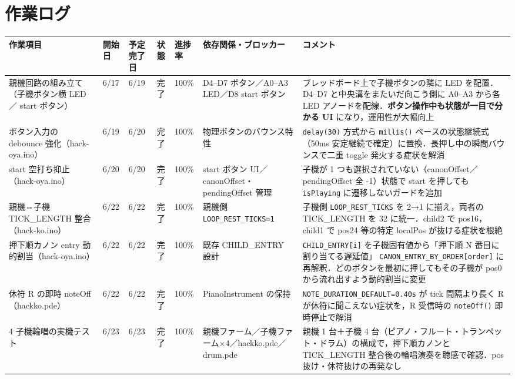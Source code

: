 \documentclass[a4paper,11pt]{ltjsarticle}
\providecommand{\％}{\%}
\begin{document}
\section{作業ログ}\label{sec:worklog}

\renewcommand{\arraystretch}{1.4}

\begingroup
\setlength{\tabcolsep}{3pt}
\sloppy
{\footnotesize
\begin{longtable}{|p{2.6cm}|p{1.1cm}|p{1.3cm}|p{1.0cm}|p{0.9cm}|p{2.2cm}|p{4.5cm}|}
\hline
\rowcolor[gray]{0.9}
作業項目 & 開始日 & 予定完了日 & 状態 & 進捗率 & 依存関係・ブロッカー & コメント \\
\hline
親機回路の組み立て（子機ボタン横 LED ／ start ボタン） & 6/17 & 6/19 & 完了 & 100\％ & D4--D7 ボタン／A0--A3 LED／D8 start ボタン & ブレッドボード上で子機ボタンの隣に LED を配置．D4--D7 と中央溝をまたいだ向こう側に A0--A3 から各 LED アノードを配線．\textbf{ボタン操作中も状態が一目で分かる UI} になり，運用性が大幅向上 \\
\hline
ボタン入力の debounce 強化（hack-oya.ino） & 6/19 & 6/20 & 完了 & 100\％ & 物理ボタンのバウンス特性 & \texttt{delay(30)} 方式から \texttt{millis()} ベースの状態継続式（50ms 安定継続で確定）に置換．長押し中の瞬間バウンスで二重 toggle 発火する症状を解消 \\
\hline
start 空打ち抑止（hack-oya.ino） & 6/20 & 6/20 & 完了 & 100\％ & start ボタン UI／canonOffset・pendingOffset 管理 & 子機が 1 つも選択されていない（canonOffset／pendingOffset 全 -1）状態で start を押しても \texttt{isPlaying} に遷移しないガードを追加 \\
\hline
親機⇔子機 TICK\_LENGTH 整合（hack-ko.ino） & 6/22 & 6/22 & 完了 & 100\％ & 親機側 \texttt{LOOP\_\-REST\_\-TICKS=1} & 子機側 \texttt{LOOP\_\-REST\_\-TICKS} を 2→1 に揃え，両者の TICK\_LENGTH を 32 に統一．child2 で pos16，child1 で pos24 等の特定 localPos が抜ける症状を根絶 \\
\hline
押下順カノン entry 動的割当（hack-oya.ino） & 6/22 & 6/22 & 完了 & 100\％ & 既存 CHILD\_ENTRY 設計 & \texttt{CHILD\_ENTRY[i]} を子機固有値から「押下順 N 番目に割り当てる遅延値」 \texttt{CANON\_ENTRY\_BY\_ORDER[order]} に再解釈．どのボタンを最初に押してもその子機が pos0 から流れ出すよう動的割当に変更 \\
\hline
休符 R の即時 noteOff（hackko.pde） & 6/22 & 6/22 & 完了 & 100\％ & PianoInstrument の保持 & \texttt{NOTE\_DURATION\_DEFAULT=0.40s} が tick 間隔より長く R が休符に聞こえない症状を，R 受信時の \texttt{noteOff()} 即時停止で解消 \\
\hline
4 子機輪唱の実機テスト & 6/23 & 6/23 & 完了 & 100\％ & 親機ファーム／子機ファーム×4／hackko.pde／drum.pde & 親機 1 台＋子機 4 台（ピアノ・フルート・トランペット・ドラム）の構成で，押下順カノンと TICK\_LENGTH 整合後の輪唱演奏を聴感で確認．pos 抜け・休符抜けの再発なし \\
\hline
\end{longtable}
}
\endgroup
\end{document}
